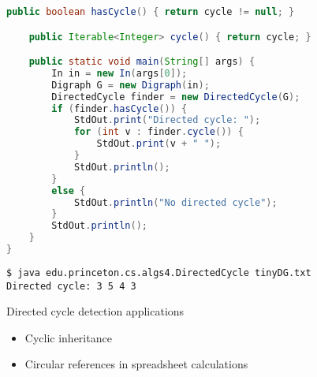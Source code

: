 \documentclass[8pt,a4paper,compress]{beamer}
\begin{document}
\begin{frame}[fragile]
\pause

\begin{lstlisting}[language=Java]
    public boolean hasCycle() { return cycle != null; }

    public Iterable<Integer> cycle() { return cycle; }

    public static void main(String[] args) {
        In in = new In(args[0]);
        Digraph G = new Digraph(in);
        DirectedCycle finder = new DirectedCycle(G);
        if (finder.hasCycle()) {
            StdOut.print("Directed cycle: ");
            for (int v : finder.cycle()) { 
                StdOut.print(v + " "); 
            }
            StdOut.println();
        }
        else {
            StdOut.println("No directed cycle");
        }
        StdOut.println();
    }
}
\end{lstlisting}

\pause

\begin{lstlisting}[language={}]
$ java edu.princeton.cs.algs4.DirectedCycle tinyDG.txt 
Directed cycle: 3 5 4 3 
\end{lstlisting}

\pause
\bigskip

Directed cycle detection applications
\begin{itemize}
\item Cyclic inheritance

\item Circular references in spreadsheet calculations
\end{itemize}
\end{frame}
\end{document}
